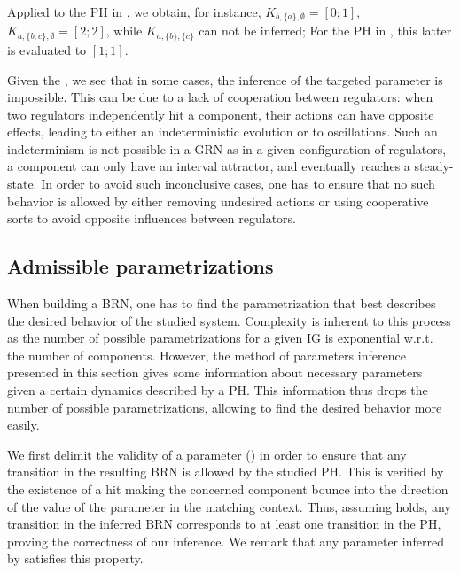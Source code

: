 \begin{example*}
Applied to the PH in , we obtain, for instance, 
$K_{b,\{a\},\emptyset} = [0 ; 1]$,
$K_{a,\{b,c\},\emptyset} = [2 ; 2]$,
while $K_{a,\{b\},\{c\}}$ can not be inferred;
For the PH in , this latter is evaluated to $[1;1]$.
\end{example*}

Given the , we see that in some cases, the inference of the targeted parameter is impossible.
This can be due to a lack of cooperation between regulators: when two regulators independently hit a component, their actions can have opposite effects, leading to either an indeterministic evolution or to oscillations.
Such an indeterminism is not possible in a GRN as in a given configuration of regulators, a component can only have an interval attractor, and eventually reaches a steady-state.
In order to avoid such inconclusive cases, one has to ensure that no such behavior is allowed by
either removing undesired actions or using cooperative sorts to avoid opposite influences between
regulators.

\subsection{Admissible parametrizations}\label{ssec:admissible-K}

When building a BRN, one has to find the parametrization that best describes the desired behavior of the studied system.
Complexity is inherent to this process as the number of possible parametrizations for a given IG is exponential w.r.t. the number of components.
However, the method of parameters inference presented in this section gives some information about necessary parameters given a certain dynamics described by a PH.
This information thus drops the number of possible parametrizations, allowing to find the desired behavior more easily.

We first delimit the validity of a parameter () in order to ensure that any
transition in the resulting BRN is allowed by the studied PH.
This is verified by the existence of a hit making the concerned component bounce into the direction
of the value of the parameter in the matching context.
Thus, assuming  holds, any transition in the inferred BRN corresponds to at least
one transition in the PH, proving the correctness of our inference.
We remark that any parameter inferred by  satisfies this property.

